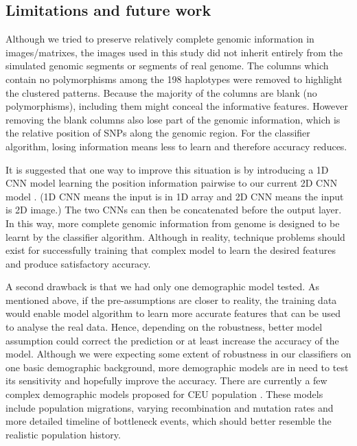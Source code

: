 \documentclass[a4paper,12pt,oneside]{extarticle}
\begin{document}
\subsection{Limitations and future work}
Although we tried to preserve relatively complete genomic information in images/matrixes, the images used in this study did not inherit entirely from the simulated genomic segments or segments of real genome. The columns which contain no polymorphisms among the 198 haplotypes were removed to highlight the clustered patterns. Because the majority of the columns are blank (no polymorphisms), including them might conceal the informative features. However removing the blank columns also lose part of the genomic information, which is the relative position of SNPs along the genomic region. For the classifier algorithm, losing information means less to learn and therefore accuracy reduces. 
\par
It is suggested that one way to improve this situation is by introducing a 1D CNN model learning the position information pairwise to our current 2D CNN model \cite{17}. (1D CNN means the input is in 1D array and 2D CNN means the input is 2D image.) The two CNNs can then be concatenated before the output layer. In this way, more complete genomic information from genome is designed to be learnt by the classifier algorithm. Although in reality, technique problems should exist for successfully training that complex model to learn the desired features and produce satisfactory accuracy.
\par
A second drawback is that we had only one demographic model tested. As mentioned above, if the pre-assumptions are closer to reality, the training data would enable model algorithm to learn more accurate features that can be used to analyse the real data. Hence, depending on the robustness, better model assumption could correct the prediction or at least increase the accuracy of the model. Although we were expecting some extent of robustness in our classifiers on one basic demographic background, more demographic models are in need to test its sensitivity and hopefully improve the accuracy. There are currently a few complex demographic models proposed for CEU population \cite{42,43}. These models include population migrations, varying recombination and mutation rates and more detailed timeline of bottleneck events, which should better resemble the realistic population history. 
\par
\end{document}
